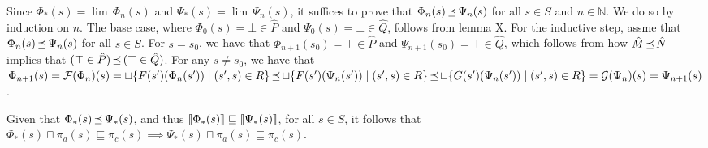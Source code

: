 Since $\Phi_{*}(s) = \lim \, \Phi_{n}(s)$ and $\Psi_{*}(s) = \lim \, \Psi_{n}(s)$, it suffices to prove that $\Phi_{n}(s) \operatorname{\mathrel{\preceq}} \Psi_{n}(s)$ for all $s \in S$ and $n \in \mathbb{N}$. We do so by induction on $n$. The base case, where $\Phi_{0}(s) = \bot \in \hat P$ and $\Psi_{0}(s) = \bot \in \hat Q$, follows from lemma X. For the inductive step, assme that $\Phi_{n}(s) \operatorname{\mathrel{\preceq}} \Psi_{n}(s)$ for all $s \in S$. For $s = s_{0}$, we have that $\Phi_{n+1}(s_{0}) = \top \in \hat P$ and $\Psi_{n+1}(s_{0}) = \top \in \hat Q$, which follows from how $\hat M \operatorname{\mathrel{\preceq}} \hat N$ implies that $(\top \in \hat P) \operatorname{\mathrel{\preceq}} \, (\top \in \hat Q)$. For any $s \neq s_{0}$, we have that $\Phi_{n+1}(s) = \mathcal{F}(\Phi_{n})(s) = \sqcup \{ F(s')(\Phi_{n}(s')) \mid (s',s) \in R \} \operatorname{\mathrel{\preceq}} \sqcup \{ F(s')(\Psi_{n}(s')) \mid (s',s) \in R \} \operatorname{\mathrel{\preceq}} \sqcup \{ G(s')(\Psi_{n}(s')) \mid (s',s) \in R \} = \mathcal{G}(\Psi_{n})(s) = \Psi_{n+1}(s)$.

Given that $\Phi_{*}(s) \operatorname{\mathrel{\preceq}} \Psi_{*}(s)$, and thus $\llbracket\Phi_{*}(s)\rrbracket \sqsubseteq \llbracket\Psi_{*}(s)\rrbracket$, for all $s \in S$, it follows that $\Phi_{*}(s) \sqcap \pi_{a}(s) \sqsubseteq \pi_{c}(s) \implies \Psi_{*}(s) \sqcap \pi_{a}(s) \sqsubseteq \pi_{c}(s)$.

